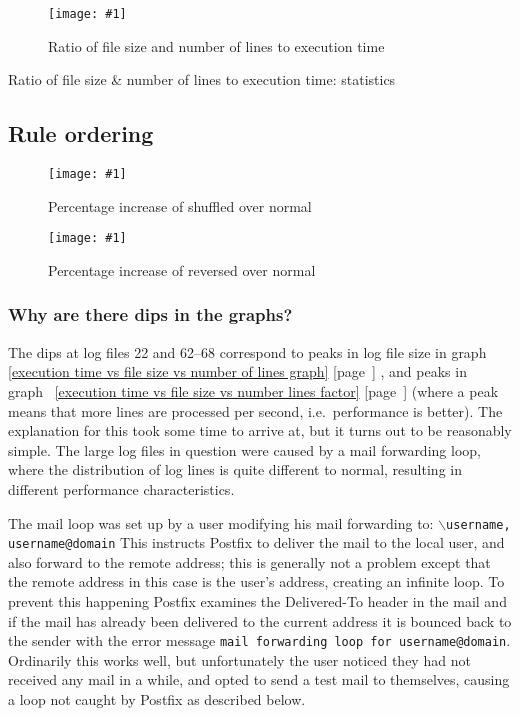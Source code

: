 \documentclass[a4paper,12pt,draft]{article}
\newcommand{\showgraph}[3]{
    \begin{figure}[hbt!]
        \caption{#2}\label{#3}
        \texttt{[image: \#1]}
    \end{figure}
}
\newcommand{\showtable}[3]{
    \begin{table}[ht]
        \caption{#2}\label{#3}
        
    \end{table}
}
\newcommand{\refwithpage}[1]{%
    \empty{}\ref{#1} [page~\pageref{#1}]%
}
\begin{document}
\showgraph{build/plot-normal-filesize-numlines-factor.ps}{Ratio of file
size and number of lines to execution time}{execution time vs file size vs
number lines factor}

\showtable{build/stats-normal-filesize-line-count-include}{Ratio of file
size \& number of lines to execution time: statistics}{execution time vs
file size vs number lines factor table}

\clearpage

\subsection{Rule ordering}

\label{rule ordering graphs}

\showgraph{build/plot-normal-shuffle-factor.ps}{Percentage increase of
shuffled over normal}{percentage increase of shuffled over normal}

\showgraph{build/plot-normal-reverse-factor.ps}{Percentage increase of
reversed over normal}{percentage increase of reversed over normal}

\subsubsection{Why are there dips in the graphs?}
\label{Why are there dips in the graphs?}

The dips at log files 22 and 62--68 correspond to peaks in log file size in
graph~\refwithpage{execution time vs file size vs number of lines graph},
and peaks in graph~\refwithpage{execution time vs file size vs number lines
factor} (where a peak means that more lines are processed per second, i.e.\
performance is better).  The explanation for this took some time to arrive
at, but it turns out to be reasonably simple.  The large log files in
question were caused by a mail forwarding loop, where the distribution of
log lines is quite different to normal, resulting in different performance
characteristics.

The mail loop was set up by a user modifying his mail forwarding to:
\newline \hspace*{2em}\texttt{$\backslash$username, username@domain}
\newline This instructs Postfix to deliver the mail to the local user, and
also forward to the remote address; this is generally not a problem except
that the remote address in this case is the user's address, creating an
infinite loop.  To prevent this happening Postfix examines the Delivered-To
header in the mail and if the mail has already been delivered to the
current address it is bounced back to the sender with the error message
\texttt{mail forwarding loop for username@domain}.  Ordinarily this works
well, but unfortunately the user noticed they had not received any mail in
a while, and opted to send a test mail to themselves, causing a loop not
caught by Postfix as described below.
\end{document}
